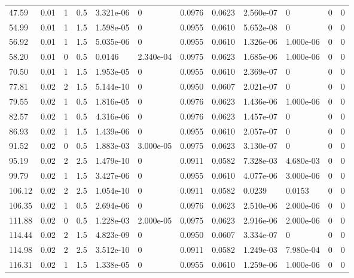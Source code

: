 \documentclass[preview]{standalone}
\begin{document}
{{\begin{tabular}{L{1.2cm}C{1.2cm} C{0.3cm}C{0.5cm} C{1.4cm}C{1.4cm} C{1.4cm}C{1.4cm} C{1.6cm}C{1.6cm} C{1.6cm}C{1.6cm}}
  47.59  &  0.01  & 1     & 0.5 &  3.321e-06  & 0  &  0.0976&   0.0623& 2.560e-07 & 0   &  0 & 0  \\ 
  54.99  &  0.01  & 1     & 1.5 &  1.598e-05  & 0  &  0.0955&   0.0610& 5.652e-08 & 0   &  0 & 0  \\ 
  56.92  &  0.01  & 1     & 1.5 &  5.035e-06  & 0  &  0.0955&   0.0610& 1.326e-06 & 1.000e-06   &  0 & 0  \\ 
  58.20  &  0.01  & 0     & 0.5 &  0.0146  & 2.340e-04  &  0.0975&   0.0623& 1.685e-06 & 1.000e-06   &  0 & 0  \\ 
  70.50  &  0.01  & 1     & 1.5 &  1.953e-05  & 0  &  0.0955&   0.0610& 2.369e-07 & 0   &  0 & 0  \\ 
  77.81  &  0.02  & 2     & 1.5 &  5.144e-10  & 0  &  0.0950&   0.0607& 2.021e-07 & 0   &  0 & 0  \\ 
  79.55  &  0.02  & 1     & 0.5 &  1.816e-05  & 0  &  0.0976&   0.0623& 1.436e-06 & 1.000e-06   &  0 & 0  \\ 
  82.57  &  0.02  & 1     & 0.5 &  4.316e-06  & 0  &  0.0976&   0.0623& 1.457e-07 & 0   &  0 & 0  \\ 
  86.93  &  0.02  & 1     & 1.5 &  1.439e-06  & 0  &  0.0955&   0.0610& 2.057e-07 & 0   &  0 & 0  \\ 
  91.52  &  0.02  & 0     & 0.5 &  1.883e-03  & 3.000e-05  &  0.0975&   0.0623& 3.130e-07 & 0   &  0 & 0  \\ 
  95.19  &  0.02  & 2     & 2.5 &  1.479e-10  & 0  &  0.0911&   0.0582& 7.328e-03 & 4.680e-03   &  0 & 0  \\ 
  99.79  &  0.02  & 1     & 1.5 &  3.427e-06  & 0  &  0.0955&   0.0610& 4.077e-06 & 3.000e-06   &  0 & 0  \\ 
  106.12  &  0.02  & 2     & 2.5 &  1.054e-10  & 0  &  0.0911&   0.0582& 0.0239 & 0.0153   &  0 & 0  \\ 
  106.35  &  0.02  & 1     & 0.5 &  2.694e-06  & 0  &  0.0976&   0.0623& 2.510e-06 & 2.000e-06   &  0 & 0  \\ 
  111.88  &  0.02  & 0     & 0.5 &  1.228e-03  & 2.000e-05  &  0.0975&   0.0623& 2.916e-06 & 2.000e-06   &  0 & 0  \\ 
  114.44  &  0.02  & 2     & 1.5 &  4.823e-09  & 0  &  0.0950&   0.0607& 3.334e-07 & 0   &  0 & 0  \\ 
  114.98  &  0.02  & 2     & 2.5 &  3.512e-10  & 0  &  0.0911&   0.0582& 1.249e-03 & 7.980e-04   &  0 & 0  \\ 
  116.31  &  0.02  & 1     & 1.5 &  1.338e-05  & 0  &  0.0955&   0.0610& 1.259e-06 & 1.000e-06   &  0 & 0  \\ 

\end{tabular}}}
\end{document}
